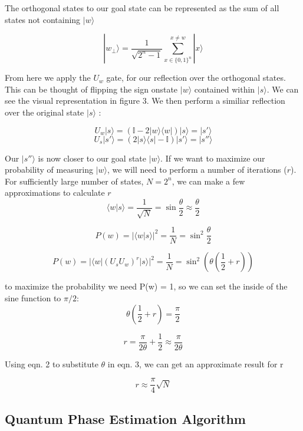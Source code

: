 \documentclass[twocolumn,showpacs,preprintnumbers,amsmath,amssymb]{revtex4}
\begin{document}
		The orthogonal states to our goal state can be represented as the sum of all states not containing $|w\rangle$
		
		$$ |w_\perp\rangle=  \frac{1}{\sqrt{2^n -1}} \sum_{x\in\{0,1\}^n}^{x \neq w} |x\rangle$$
		
		From here we apply the $U_w$ gate, for our reflection over the orthogonal states. This can be thought of flipping the sign onstate $|w\rangle$ contained within $|s\rangle$. We can see the visual representation in figure 3. We then perform a similiar reflection over the original state $|s\rangle$ :
		
		$$ U_w|s \rangle	=  (\mathbb {I} - 2|w \rangle \langle w|) |s \rangle = |s'\rangle$$
		$$ U_s|s' \rangle	=  (2|s \rangle \langle s| - \mathbb {I}) |s' \rangle = |s''\rangle$$
		
		Our $|s''\rangle$ is now closer to our goal state $|w\rangle$.  If we want to maximize our probability of measuring  $|w\rangle$, we will need to perform a number of iterations ($r$). For sufficiently large number of states, $N = 2^n$, we can make a few approximations to calculate $r$
		\begin{equation}
			\langle w | s \rangle = \frac{1}{\sqrt{N}} = \sin \frac{\theta}{2} \approx \frac{\theta}{2}
		\end{equation}
		
		
		$$P(w) = |\langle w | s \rangle|^2 = \frac{1}{N} = \sin^2 \frac{\theta}{2} $$
		
		$$P(w) = |\langle w |(U_sU_w)^r |s \rangle|^2 = \frac{1}{N} = \sin^2 (\theta(\frac{1}{2} + r)) $$
		
		to maximize the probability we need P(w) = 1, so we can set the inside of the sine function to $\pi/2$:
		$$ \theta \left(\frac{1}{2} + r \right) = \frac{\pi}{2}$$
		
		\begin{equation}
			r = \frac{\pi}{2\theta} + \frac{1}{2} \approx \frac{\pi}{2\theta}
		\end{equation}
		
		Using eqn. 2 to substitute $\theta$ in eqn. 3, we can get an approximate result for r
		
		\begin{equation}
			r \approx \frac{\pi}{4}\sqrt{N}
		\end{equation}
		
		
		\subsection{Quantum Phase Estimation Algorithm}
		
\end{document}
